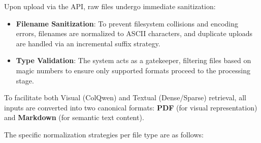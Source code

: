 Upon upload via the API, raw files undergo immediate sanitization:
\begin{itemize}
    \item \textbf{Filename Sanitization}: To prevent filesystem collisions and encoding errors, filenames are normalized to ASCII characters, and duplicate uploads are handled via an incremental suffix strategy.
    \item \textbf{Type Validation}: The system acts as a gatekeeper, filtering files based on magic numbers to ensure only supported formats proceed to the processing stage.
\end{itemize}


To facilitate both Visual (ColQwen) and Textual (Dense/Sparse) retrieval, all inputs are converted into two canonical formats: \textbf{PDF} (for visual representation) and \textbf{Markdown} (for semantic text content).

The specific normalization strategies per file type are as follows:









